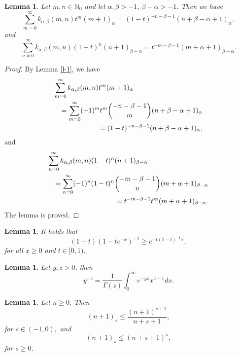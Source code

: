 \documentclass[10pt]{amsart}
\newtheorem{lemma}[theorem]{Lemma}
\theoremstyle{definition}
\theoremstyle{question}
\numberwithin{equation}{section}
\begin{document}
\begin{lemma}\label{l-2} Let $m, n \in \mathbb{N}_0$ and let $\alpha, \beta>-1$, $\beta-\alpha>-1$. Then we have
\begin{equation}
\sum_{m=0}^{\infty}k_{\alpha, \beta}(m,n)t^m(m+1)_{\alpha}=(1-t)^{-n-\beta-1}(n+\beta-\alpha+1)_{\alpha}, \nonumber 
\end{equation} 
and
\begin{equation}
\sum_{n=0}^{\infty}k_{\alpha, \beta}(m,n)(1-t)^n(n+1)_{\beta-\alpha}=t^{-m-\beta-1}(m+\alpha+1)_{\beta-\alpha}. \nonumber 
\end{equation} \end{lemma}

\begin{proof}
By Lemma \ref{l-1}, we have
\begin{eqnarray}
\lefteqn{\sum_{m=0}^{\infty}k_{\alpha, \beta}(m,n)t^m(m+1)_{\alpha}}\nonumber \\ 
&&=\sum_{m=0}^{\infty}(-1)^m t^m \binom{-n-\beta-1}{m}(n+\beta-\alpha+1)_{\alpha}\nonumber \\
&&=(1-t)^{-n-\beta-1}(n+\beta-\alpha+1)_{\alpha}\nonumber,
\end{eqnarray}
and 
\begin{eqnarray}
\lefteqn{\sum_{n=0}^{\infty}k_{\alpha, \beta}(m,n)(1-t)^n(n+1)_{\beta-\alpha}}\nonumber \\
&&=\sum_{n=0}^{\infty}(-1)^n (1-t)^n \binom{-m-\beta-1}{n}(m+\alpha+1)_{\beta-\alpha}  \nonumber \\
&&=t^{-m-\beta-1}t^m(m+\alpha+1)_{\beta-\alpha}. \nonumber
\end{eqnarray}
The lemma is proved.
\end{proof}

\begin{lemma}\cite[Lemma 1.4]{Ath}\label{l-5} It holds that $$(1-t)(1-te^{-x})^{-1}\geq e^{-t(1-t)^{-1}x},$$ 
for all $x\geq 0$ and $t\in[0,1)$. \end{lemma}

\begin{lemma}\cite[Lemma 1.5]{Ath}\label{l-4} Let $y,z>0$, then $$y^{-z}=\frac{1}{\Gamma(z)}\int_{0}^{\infty}e^{-yx}x^{z-1}dx.$$ \end{lemma}

\begin{lemma}\cite[Lemma 1]{Con}\label{l-3} Let $n\geq 0$. Then $$(n+1)_{s}\leq \frac{(n+1)^{s+1}}{n+s+1},$$
for $s\in (-1,0),$
and  $$(n+1)_{s}\leq (n+s+1)^{s},$$
for $s\geq 0$.\end{lemma}
\end{document}
